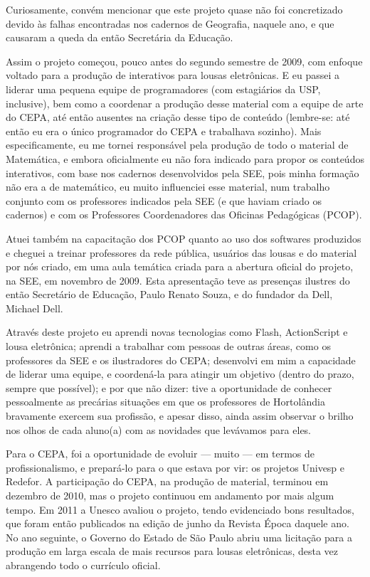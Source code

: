 Curiosamente, convém mencionar que este projeto quase não foi concretizado devido às falhas encontradas nos cadernos de Geografia, naquele ano, e que causaram a queda da então Secretária da Educação.

Assim o projeto começou, pouco antes do segundo semestre de 2009, com enfoque voltado para a produção de  interativos para lousas eletrônicas. E eu passei a liderar uma pequena equipe de programadores (com estagiários da USP, inclusive), bem como a coordenar a produção desse material com a equipe de arte do CEPA, até então ausentes na criação desse tipo de conteúdo (lembre-se: até então eu era o único programador do CEPA e trabalhava sozinho). Mais especificamente, eu me tornei responsável pela produção de todo o material de Matemática, e embora oficialmente eu não fora indicado para propor os conteúdos interativos, com base nos cadernos desenvolvidos pela SEE, pois minha formação não era a de matemático, eu muito influenciei esse material, num trabalho conjunto com os professores indicados pela SEE (e que haviam criado os cadernos) e com os Professores Coordenadores das Oficinas Pedagógicas (PCOP).

Atuei também na capacitação dos PCOP quanto ao uso dos softwares produzidos e cheguei a treinar professores da rede pública, usuários das lousas e do material por nós criado, em uma aula temática criada para a abertura oficial do projeto, na SEE, em novembro de 2009. Esta apresentação teve as presenças ilustres do então Secretário de Educação, Paulo Renato Souza, e do fundador da Dell, Michael Dell.

Através deste projeto eu aprendi novas tecnologias como Flash, ActionScript e lousa eletrônica; aprendi a trabalhar com pessoas de outras áreas, como os professores da SEE e os ilustradores do CEPA; desenvolvi em mim a capacidade de liderar uma equipe, e coordená-la para atingir um objetivo (dentro do prazo, sempre que possível); e por que não dizer: tive a oportunidade de conhecer pessoalmente as precárias situações em que os professores de Hortolândia bravamente exercem sua profissão, e apesar disso, ainda assim observar o brilho nos olhos de cada aluno(a) com as novidades que levávamos para eles.

Para o CEPA, foi a oportunidade de evoluir --- muito --- em termos de profissionalismo, e prepará-lo para o que estava por vir: os projetos Univesp e Redefor. A participação do CEPA, na produção de material, terminou em dezembro de 2010, mas o projeto continuou em andamento por mais algum tempo. Em 2011 a Unesco avaliou o projeto, tendo evidenciado bons resultados, que foram então publicados na edição de junho da Revista Época daquele ano. No ano seguinte, o Governo do Estado de São Paulo abriu uma licitação para a produção em larga escala de mais recursos para lousas eletrônicas, desta vez abrangendo todo o currículo oficial.

